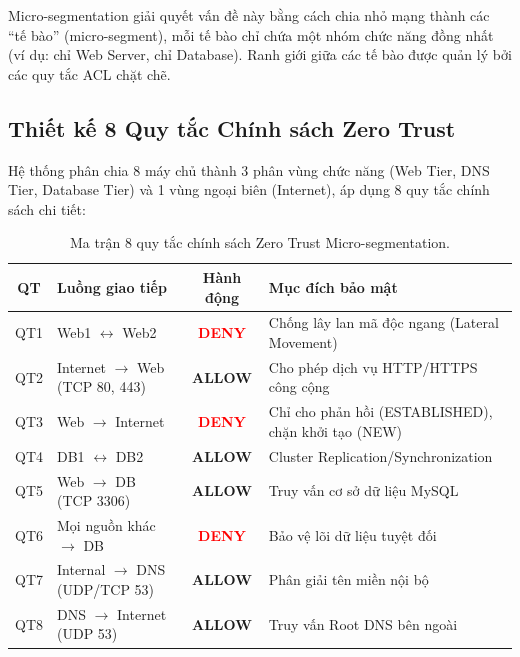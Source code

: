 Micro-segmentation giải quyết vấn đề này bằng cách chia nhỏ mạng thành các ``tế bào'' (micro-segment), mỗi tế bào chỉ chứa một nhóm chức năng đồng nhất (ví dụ: chỉ Web Server, chỉ Database). Ranh giới giữa các tế bào được quản lý bởi các quy tắc ACL chặt chẽ.

\subsection{Thiết kế 8 Quy tắc Chính sách Zero Trust}

Hệ thống phân chia 8 máy chủ thành 3 phân vùng chức năng (Web Tier, DNS Tier, Database Tier) và 1 vùng ngoại biên (Internet), áp dụng 8 quy tắc chính sách chi tiết:

\begin{table}[H]
    \centering
    \caption{Ma trận 8 quy tắc chính sách Zero Trust Micro-segmentation.}
    \label{tab:acl_policies}
    \begin{tabular}{|c|p{4.5cm}|c|p{4.5cm}|}
        \hline
        \textbf{QT} & \textbf{Luồng giao tiếp} & \textbf{Hành động} & \textbf{Mục đích bảo mật} \\
        \hline
        QT1 & Web1 $\leftrightarrow$ Web2 & \textcolor{red}{\textbf{DENY}} & Chống lây lan mã độc ngang (Lateral Movement) \\
        \hline
        QT2 & Internet $\rightarrow$ Web (TCP 80, 443) & \textcolor{green!60!black}{\textbf{ALLOW}} & Cho phép dịch vụ HTTP/HTTPS công cộng \\
        \hline
        QT3 & Web $\rightarrow$ Internet & \textcolor{red}{\textbf{DENY}} & Chỉ cho phản hồi (ESTABLISHED), chặn khởi tạo (NEW) \\
        \hline
        QT4 & DB1 $\leftrightarrow$ DB2 & \textcolor{green!60!black}{\textbf{ALLOW}} & Cluster Replication/Synchronization \\
        \hline
        QT5 & Web $\rightarrow$ DB (TCP 3306) & \textcolor{green!60!black}{\textbf{ALLOW}} & Truy vấn cơ sở dữ liệu MySQL \\
        \hline
        QT6 & Mọi nguồn khác $\rightarrow$ DB & \textcolor{red}{\textbf{DENY}} & Bảo vệ lõi dữ liệu tuyệt đối \\
        \hline
        QT7 & Internal $\rightarrow$ DNS (UDP/TCP 53) & \textcolor{green!60!black}{\textbf{ALLOW}} & Phân giải tên miền nội bộ \\
        \hline
        QT8 & DNS $\rightarrow$ Internet (UDP 53) & \textcolor{green!60!black}{\textbf{ALLOW}} & Truy vấn Root DNS bên ngoài \\
        \hline
    \end{tabular}
\end{table}

